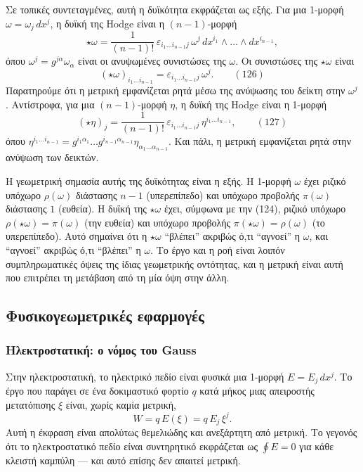 \documentclass[12pt]{article}
\begin{document}
Σε τοπικές συντεταγμένες, αυτή η δυϊκότητα εκφράζεται ως εξής. Για μια 1-μορφή $\omega = \omega_j \, dx^j$, η δυϊκή της Hodge είναι η $(n-1)$-μορφή
\[
\star \omega = \frac{1}{(n-1)!} \, \varepsilon_{i_1 \dots i_{n-1} j} \, \omega^j \, dx^{i_1} \wedge \dots \wedge dx^{i_{n-1}},
\]
όπου $\omega^j = g^{j\alpha} \omega_\alpha$ είναι οι ανυψωμένες συνιστώσες της $\omega$. Οι συνιστώσες της $\star \omega$ είναι
\begin{equation}
(\star \omega)_{i_1 \dots i_{n-1}} = \varepsilon_{i_1 \dots i_{n-1} j} \, \omega^j. \qquad (126)
\end{equation}
Παρατηρούμε ότι η μετρική εμφανίζεται ρητά μέσω της ανύψωσης του δείκτη στην $\omega^j$. Αντίστροφα, για μια $(n-1)$-μορφή $\eta$, η δυϊκή της Hodge είναι η 1-μορφή
\begin{equation}
(\star \eta)_j = \frac{1}{(n-1)!} \, \varepsilon_{i_1 \dots i_{n-1} j} \, \eta^{i_1 \dots i_{n-1}}, \qquad (127)
\end{equation}
όπου $\eta^{i_1 \dots i_{n-1}} = g^{i_1 \alpha_1} \dots g^{i_{n-1} \alpha_{n-1}} \eta_{\alpha_1 \dots \alpha_{n-1}}$. Και πάλι, η μετρική εμφανίζεται ρητά στην ανύψωση των δεικτών.

Η γεωμετρική σημασία αυτής της δυϊκότητας είναι η εξής. Η 1-μορφή $\omega$ έχει ριζικό υπόχωρο $\rho(\omega)$ διάστασης $n-1$ (υπερεπίπεδο) και υπόχωρο προβολής $\pi(\omega)$ διάστασης $1$ (ευθεία). Η δυϊκή της $\star \omega$ έχει, σύμφωνα με την (124), ριζικό υπόχωρο $\rho(\star \omega) = \pi(\omega)$ (την ευθεία) και υπόχωρο προβολής $\pi(\star \omega) = \rho(\omega)$ (το υπερεπίπεδο). Αυτό σημαίνει ότι η $\star \omega$ ``βλέπει'' ακριβώς ό,τι ``αγνοεί'' η $\omega$, και ``αγνοεί'' ακριβώς ό,τι ``βλέπει'' η $\omega$. Το έργο και η ροή είναι λοιπόν συμπληρωματικές όψεις της ίδιας γεωμετρικής οντότητας, και η μετρική είναι αυτή που επιτρέπει τη μετάβαση από τη μία όψη στην άλλη.

\subsection{Φυσικογεωμετρικές εφαρμογές}

\subsubsection{Ηλεκτροστατική: ο νόμος του Gauss}

Στην ηλεκτροστατική, το ηλεκτρικό πεδίο είναι φυσικά μια 1-μορφή $E = E_j \, dx^j$. Το έργο που παράγει σε ένα δοκιμαστικό φορτίο $q$ κατά μήκος μιας απειροστής μετατόπισης $\xi$ είναι, χωρίς καμία μετρική,
\[
W = q \, E(\xi) = q \, E_j \, \xi^j.
\]
Αυτή η έκφραση είναι απολύτως θεμελιώδης και ανεξάρτητη από μετρική. Το γεγονός ότι το ηλεκτροστατικό πεδίο είναι συντηρητικό εκφράζεται ως $\oint E = 0$ για κάθε κλειστή καμπύλη — και αυτό επίσης δεν απαιτεί μετρική.
\end{document}
